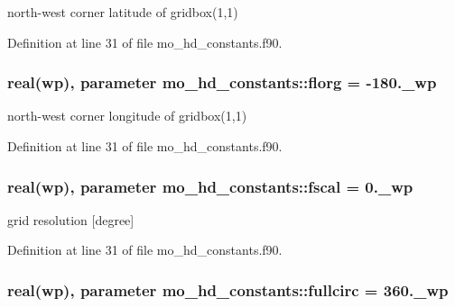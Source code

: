 north-\/west corner latitude of gridbox(1,1) 



Definition at line 31 of file mo\+\_\+hd\+\_\+constants.\+f90.

\hypertarget{namespacemo__hd__constants_a92e3ff05e4400fd3ce8a5b2b051040a3}{}
\subsubsection[{florg}]{\setlength{\rightskip}{0pt plus 5cm}real(wp), parameter mo\+\_\+hd\+\_\+constants\+::florg = -\/180.\+\_\+wp}\label{namespacemo__hd__constants_a92e3ff05e4400fd3ce8a5b2b051040a3}


north-\/west corner longitude of gridbox(1,1) 



Definition at line 31 of file mo\+\_\+hd\+\_\+constants.\+f90.

\hypertarget{namespacemo__hd__constants_ad75b06fdc814a4a8eefcb76b47760ded}{}
\subsubsection[{fscal}]{\setlength{\rightskip}{0pt plus 5cm}real(wp), parameter mo\+\_\+hd\+\_\+constants\+::fscal = 0.\+\_\+wp}\label{namespacemo__hd__constants_ad75b06fdc814a4a8eefcb76b47760ded}


grid resolution \mbox{[}degree\mbox{]} 



Definition at line 31 of file mo\+\_\+hd\+\_\+constants.\+f90.

\hypertarget{namespacemo__hd__constants_ad86ad4525b3aaf33c6b5a61de4a3dd77}{}
\subsubsection[{fullcirc}]{\setlength{\rightskip}{0pt plus 5cm}real(wp), parameter mo\+\_\+hd\+\_\+constants\+::fullcirc = 360.\+\_\+wp}\label{namespacemo__hd__constants_ad86ad4525b3aaf33c6b5a61de4a3dd77}


